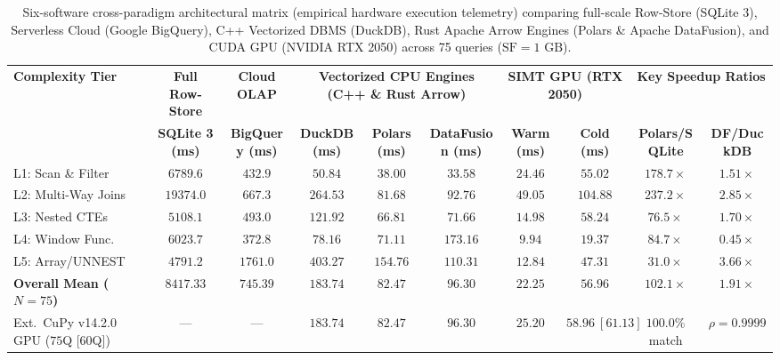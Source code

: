 \documentclass[10pt,a4paper]{article}
\newenvironment{fitasttable}{%
  \begin{lrbox}{\asttblbox}%
}{%
  \end{lrbox}%
  \sbox{\asttblboxB}{%
    \ifdim\wd\asttblbox>0.96\textwidth
      \resizebox{0.96\textwidth}{!}{\usebox{\asttblbox}}%
    \else
      \usebox{\asttblbox}%
    \fi
  }%
  \ifdim\ht\asttblboxB>0.72\textheight
    \resizebox{!}{0.72\textheight}{\usebox{\asttblboxB}}%
  \else
    \usebox{\asttblboxB}%
  \fi
}
\begin{document}
\begin{table}[!htbp]
\centering
\caption{Six-software cross-paradigm architectural matrix (empirical hardware execution telemetry) comparing full-scale Row-Store (SQLite 3), Serverless Cloud (Google BigQuery), C++ Vectorized DBMS (DuckDB), Rust Apache Arrow Engines (Polars \& Apache DataFusion), and CUDA GPU (NVIDIA RTX 2050) across 75 queries ($\text{SF}=1\text{ GB}$).}\label{tab:jbd_six_eng_t5}
\label{tab:six_software_matrix}
\scriptsize
\setlength{\tabcolsep}{3.2pt}
\renewcommand{\arraystretch}{1.12}
\begin{fitasttable}
\begin{tabular}{@{}lccccccccc@{}}
\toprule
\multirow{2}{*}{\textbf{Complexity Tier}} & \textbf{Full Row-Store} & \textbf{Cloud OLAP} & \multicolumn{3}{c}{\textbf{Vectorized CPU Engines (C++ \& Rust Arrow)}} & \multicolumn{2}{c}{\textbf{SIMT GPU (RTX 2050)}} & \multicolumn{2}{c}{\textbf{Key Speedup Ratios}} \\
\cmidrule(lr){2-2} \cmidrule(lr){3-3} \cmidrule(lr){4-6} \cmidrule(lr){7-8} \cmidrule(lr){9-10}
 & \textbf{SQLite 3 (ms)} & \textbf{BigQuery (ms)} & \textbf{DuckDB (ms)} & \textbf{Polars (ms)} & \textbf{DataFusion (ms)} & \textbf{Warm (ms)} & \textbf{Cold (ms)} & \textbf{Polars/SQLite} & \textbf{DF/DuckDB} \\
\midrule
L1: Scan \& Filter & $6789.6$ & $432.9$ & $50.84$ & $38.00$ & $\mathbf{33.58}$ & $\mathbf{24.46}$ & $55.02$ & $178.7\times$ & $1.51\times$ \\
L2: Multi-Way Joins & $19374.0$ & $667.3$ & $264.53$ & $\mathbf{81.68}$ & $92.76$ & $\mathbf{49.05}$ & $104.88$ & $237.2\times$ & $2.85\times$ \\
L3: Nested CTEs & $5108.1$ & $493.0$ & $121.92$ & $66.81$ & $71.66$ & $\mathbf{14.98}$ & $\mathbf{58.24}$ & $76.5\times$ & $1.70\times$ \\
L4: Window Func. & $6023.7$ & $372.8$ & $78.16$ & $71.11$ & $173.16$ & $\mathbf{9.94}$ & $\mathbf{19.37}$ & $84.7\times$ & $0.45\times$ \\
L5: Array/UNNEST & $4791.2$ & $1761.0$ & $403.27$ & $154.76$ & $110.31$ & $\mathbf{12.84}$ & $\mathbf{47.31}$ & $31.0\times$ & $3.66\times$ \\
\midrule
\textbf{Overall Mean ($N=75$)} & $\mathbf{8417.33}$ & $\mathbf{745.39}$ & $\mathbf{183.74}$ & $\mathbf{82.47}$ & $\mathbf{96.30}$ & $\mathbf{22.25}$ & $\mathbf{56.96}$ & $\mathbf{102.1\times}$ & $\mathbf{1.91\times}$ \\
\midrule
Ext.\ CuPy v14.2.0 GPU ($75$Q [$60$Q]) & --- & --- & $183.74$ & $82.47$ & $96.30$ & $\mathbf{25.20}$ & $\mathbf{58.96\ [61.13]}$ & $100.0\%$ match & $\rho=0.9999$ \\

\end{tabular}
\end{fitasttable}
\end{table}
\end{document}
